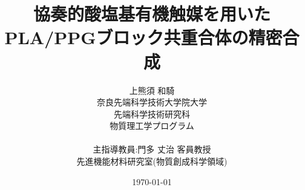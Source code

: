 \title{協奏的酸塩基有機触媒を用いた\\PLA/PPGブロック共重合体の精密合成{\vspace{5cm}}}

\author{上熊須 和騎\\奈良先端科学技術大学院大学\\先端科学技術研究科\\物質理工学プログラム\\\\主指導教員:門多 丈治 客員教授\\先進機能材料研究室(物質創成科学領域)}
\date{\today}
